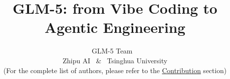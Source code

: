 \documentclass{article}
\title{GLM-5: from Vibe Coding to Agentic Engineering}
\author{
{GLM-5 Team}
~\\
Zhipu AI ~\&~ Tsinghua University\\
(For the complete list of authors, please refer to the \hyperref[sec:contribution]{Contribution} section)
{}
}
\theoremstyle{definition}
\begin{document}
\maketitle

\vspace{-1.5em}
\begin{abstract}



\end{abstract}











\clearpage




\clearpage


\end{document}
